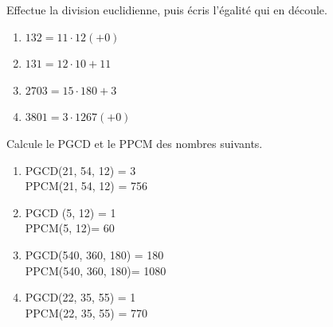 \documentclass[12pt,parskip=half-, twoside=semi]{scrartcl}
\begin{document}
\begin{exercise}
  Effectue la division euclidienne, puis écris l'égalité qui en découle.
    \begin{enumerate}[cols=2]
      \item \(132 = 11 \cdot 12 (+ 0)\)
      \item \(131 = 12 \cdot 10 + 11\)
      \item \(2703=15 \cdot 180 + 3\)
      \item \(3801 = 3 \cdot 1267 (+0)\)
    \end{enumerate}
\end{exercise}

\begin{exercise}
  Calcule le PGCD et le PPCM des nombres suivants. 
    \begin{enumerate}[cols=2]
      \item  PGCD(21, 54, 12) = 3 \\ PPCM(21, 54, 12) = 756 
      \item PGCD (5, 12) = 1 \\ PPCM(5, 12)= 60
      \item PGCD(540, 360, 180) = 180 \\ PPCM(540, 360, 180)= 1080
      \item PGCD(22, 35, 55) = 1\\ PPCM(22, 35, 55) = 770
    \end{enumerate}
\end{exercise}
  
\end{document}

